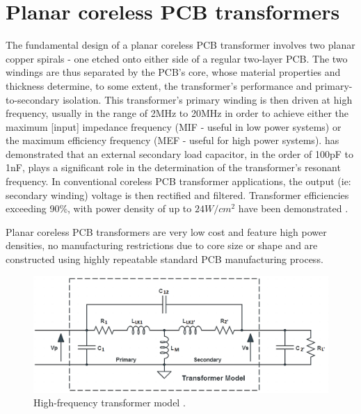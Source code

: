 \documentclass[conference]{IEEEtran}
\begin{document}
\section{Planar coreless PCB transformers}

The fundamental design of a planar coreless PCB transformer involves two planar copper spirals - one etched onto either side of a regular two-layer PCB.  The two windings are thus separated by the PCB's core, whose material properties and thickness determine, to some extent, the transformer's performance and primary-to-secondary isolation.  This transformer's primary winding is then driven at high frequency, usually in the range of 2MHz to 20MHz in order to achieve either the maximum [input] impedance frequency (MIF - useful in low power systems) or the maximum efficiency frequency (MEF - useful for high power systems)\cite{TangHuiFundamental}\cite{NaturallySoft}\cite{OptimalOperation}\cite{CorelessGateDrive}.  \cite{TangHuiFundamental} has demonstrated that an external secondary load capacitor, in the order of 100pF to 1nF, plays a significant role in the determination of the transformer's resonant frequency.  In conventional coreless PCB transformer applications, the output (ie: secondary winding) voltage is then rectified and filtered.  Transformer efficiencies exceeding 90\%, with power density of up to $ 24W/cm^{2} $ have been demonstrated \cite{TangHuiFundamental}.

Planar coreless PCB transformers are very low cost and feature high power densities, no manufacturing restrictions due to core size or shape and are constructed using highly repeatable standard PCB manufacturing process. 

\begin{figure}[t]
	\centering
	\includegraphics[width=1\columnwidth]{./img/HF_Model}
	\caption{High-frequency transformer model \cite{TangHuiFundamental}.}
	\label{fig:HF-Model}
\end{figure}
\end{document}
